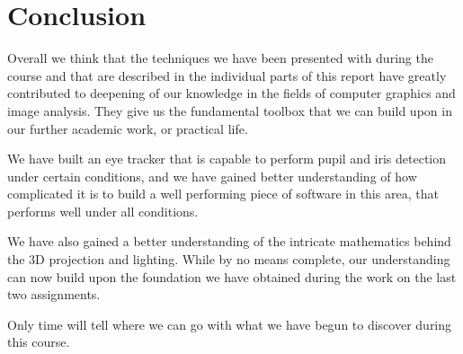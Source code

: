 \pagebreak
\section{Conclusion}

Overall we think that the techniques we have been presented with during the course and that are described in the individual parts of this report have greatly contributed to deepening of our knowledge in the fields of computer graphics and image analysis. They give us the fundamental toolbox that we can build upon in our further academic work, or practical life. 

We have built an eye tracker that is capable to perform pupil and iris detection under certain conditions, and we have gained better understanding of how complicated it is to build a well performing piece of software in this area, that performs well under all conditions.

We have also gained a better understanding of the intricate mathematics behind the 3D projection and lighting. While by no means complete, our understanding can now build upon the foundation we have obtained during the work on the last two assignments.

Only time will tell where we can go with what we have begun to discover during this course.
